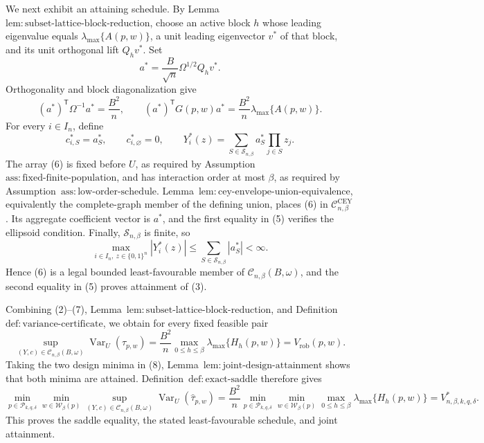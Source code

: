 We next exhibit an attaining schedule.  By Lemma~\(\mathrm{lem{:}subset\text{-}lattice\text{-}block\text{-}reduction}\), choose an active block \(h\) whose leading eigenvalue equals \(\lambda_{\max}\{A(p,w)\}\), a unit leading eigenvector \(v^*\) of that block, and its unit orthogonal lift \(Q_hv^*\).  Set
\[
a^*=\frac{B}{\sqrt n}\Omega^{1/2}Q_hv^*.
\tag{4}
\]
Orthogonality and block diagonalization give
\[
(a^*)^{\mathsf T}\Omega^{-1}a^*=\frac{B^2}{n},
\qquad
(a^*)^{\mathsf T}G(p,w)a^*
=\frac{B^2}{n}\lambda_{\max}\{A(p,w)\}.
\tag{5}
\]
For every \(i\in I_n\), define
\[
c^*_{i,S}=a^*_S,
\qquad c^*_{i,\varnothing}=0,
\qquad
Y_i^*(z)=\sum_{S\in\mathcal S_{n,\beta}}a^*_S\prod_{j\in S}z_j.
\tag{6}
\]
The array (6) is fixed before \(U\), as required by Assumption~\(\mathrm{ass{:}fixed\text{-}finite\text{-}population}\), and has interaction order at most \(\beta\), as required by Assumption~\(\mathrm{ass{:}low\text{-}order\text{-}schedule}\).  Lemma~\(\mathrm{lem{:}cey\text{-}envelope\text{-}union\text{-}equivalence}\), equivalently the complete-graph member of the defining union, places (6) in \(\mathcal C^{\mathrm{CEY}}_{n,\beta}\).  Its aggregate coefficient vector is \(a^*\), and the first equality in (5) verifies the ellipsoid condition.  Finally, \(\mathcal S_{n,\beta}\) is finite, so
\[
\max_{i\in I_n,\ z\in\{0,1\}^n}|Y_i^*(z)|
\le \sum_{S\in\mathcal S_{n,\beta}}|a_S^*|<\infty.
\tag{7}
\]
Hence (6) is a legal bounded least-favourable member of \(\mathcal C_{n,\beta}(B,\omega)\), and the second equality in (5) proves attainment of (3).

Combining (2)--(7), Lemma~\(\mathrm{lem{:}subset\text{-}lattice\text{-}block\text{-}reduction}\), and Definition~\(\mathrm{def{:}variance\text{-}certificate}\), we obtain for every fixed feasible pair
\[
\sup_{(Y,c)\in\mathcal C_{n,\beta}(B,\omega)}
\operatorname{Var}_U(\widehat\tau_{p,w})
=\frac{B^2}{n}\max_{0\le h\le\beta}
\lambda_{\max}\{H_h(p,w)\}
=V_{\mathrm{rob}}(p,w).
\tag{8}
\]
Taking the two design minima in (8), Lemma~\(\mathrm{lem{:}joint\text{-}design\text{-}attainment}\) shows that both minima are attained.  Definition~\(\mathrm{def{:}exact\text{-}saddle}\) therefore gives
\[
\min_{p\in\mathcal P_{k,q,\delta}}
\min_{w\in\mathcal W_\beta(p)}
\sup_{(Y,c)\in\mathcal C_{n,\beta}(B,\omega)}
\operatorname{Var}_U(\widehat\tau_{p,w})
=\frac{B^2}{n}
\min_{p\in\mathcal P_{k,q,\delta}}
\min_{w\in\mathcal W_\beta(p)}
\max_{0\le h\le\beta}\lambda_{\max}\{H_h(p,w)\}
=V^*_{n,\beta,k,q,\delta}.
\tag{9}
\]
This proves the saddle equality, the stated least-favourable schedule, and joint attainment.

